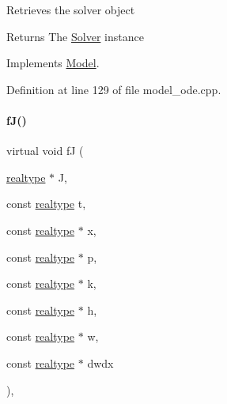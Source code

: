 Retrieves the solver object \begin{DoxyReturn}{Returns}
The \mbox{\hyperlink{classamici_1_1_solver}{Solver}} instance 
\end{DoxyReturn}


Implements \mbox{\hyperlink{classamici_1_1_model_a61d5b19b2e4d5ffcc73a014d59494344}{Model}}.



Definition at line 129 of file model\+\_\+ode.\+cpp.

\mbox{\label{classamici_1_1_model___o_d_e_a8b89346ce4703324beee7e7c4c8997b2}} 
\paragraph{\texorpdfstring{f\+J()}{fJ()}\hspace{0.1cm}{\footnotesize\ttfamily [3/3]}}
{\footnotesize\ttfamily virtual void fJ (\begin{DoxyParamCaption}\item[{\mbox{\hyperlink{namespaceamici_a1bdce28051d6a53868f7ccbf5f2c14a3}{realtype}} $\ast$}]{J,  }\item[{const \mbox{\hyperlink{namespaceamici_a1bdce28051d6a53868f7ccbf5f2c14a3}{realtype}}}]{t,  }\item[{const \mbox{\hyperlink{namespaceamici_a1bdce28051d6a53868f7ccbf5f2c14a3}{realtype}} $\ast$}]{x,  }\item[{const \mbox{\hyperlink{namespaceamici_a1bdce28051d6a53868f7ccbf5f2c14a3}{realtype}} $\ast$}]{p,  }\item[{const \mbox{\hyperlink{namespaceamici_a1bdce28051d6a53868f7ccbf5f2c14a3}{realtype}} $\ast$}]{k,  }\item[{const \mbox{\hyperlink{namespaceamici_a1bdce28051d6a53868f7ccbf5f2c14a3}{realtype}} $\ast$}]{h,  }\item[{const \mbox{\hyperlink{namespaceamici_a1bdce28051d6a53868f7ccbf5f2c14a3}{realtype}} $\ast$}]{w,  }\item[{const \mbox{\hyperlink{namespaceamici_a1bdce28051d6a53868f7ccbf5f2c14a3}{realtype}} $\ast$}]{dwdx }\end{DoxyParamCaption})\hspace{0.3cm}{\ttfamily [protected]}, {}}

